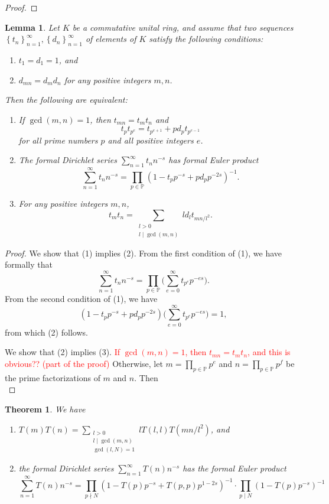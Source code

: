 \documentclass[10pt,leqno,twoside]{article}
\theoremstyle{plain}
\newtheorem{lemma}[lem]{Lemma}
\newtheorem{theorem}[lem]{Theorem}
\theoremstyle{definition}
\numberwithin{equation}{section}
\numberwithin{lem}{section}
\newcommand{\cbr}[1]{\left\{#1\right\}}
\newcommand{\textib}[1]{\textbf{\textit{#1\index{#1}}}} %
\newcommand{\tbd}{{\Huge\color{red}{\textib{TBD}}}}
\newcommand{\sai}[1]{\textcolor{red}{#1}}
\begin{document}
\begin{proof}
    \tbd
\end{proof}
\begin{lemma}\label{lem: miyake lem 4.5.12}
    Let $K$ be a commutative unital ring, and assume that two sequences $\cbr{t_n}_{n=1}^\infty,\cbr{d_n}_{n=1}^\infty$ of elements of $K$ satisfy the following conditions:
    \begin{enumerate}[label=\textup{(\roman*)}]
        \item $t_1 =d_1 = 1$, and 
        \item $d_{mn} = d_md_n$ for any positive integers $m,n$.
    \end{enumerate} Then the following are equivalent:
    \begin{enumerate}[label=\textup{(\arabic*)}]
        \item If $\gcd(m,n) = 1$, then $t_{mn} = t_mt_n$ and \[t_pt_{p^e} = t_{p^{e+1}} + pd_pt_{p^{e-1}}\] for all prime numbers $p$ and all positive integers $e$.
        \item The formal Dirichlet series $\sum_{n=1}^\infty t_nn^{-s}$ has formal Euler product \[\sum_{n=1}^\infty t_nn^{-s} = \prod_{p\in\mathbb P}(1-t_pp^{-s} + pd_pp^{-2s})^{-1}.\]
        \item For any positive integers $m,n$, \[t_mt_n = \sum_{\substack{l>0\\l\mid \gcd(m,n)}}ld_lt_{mn/l^2}.\]
    \end{enumerate}
\end{lemma}
\begin{proof}
    We show that (1) implies (2). From the first condition of (1), we have formally that 
    \[\sum_{n=1}^\infty t_nn^{-s} = \prod_{p\in\mathbb P}\bigg(\sum_{e=0}^\infty t_{p^e}p^{-es}\bigg).\]
    From the second condition of (1), we have \[(1-t_pp^{-s} + pd_pp^{-2s})\bigg(\sum_{e=0}^\infty t_{p^e}p^{-es}\bigg) = 1,\] from which (2) follows. 

    We show that (2) implies (3). \sai{If $\gcd(m,n) =1$, then $t_{mn} = t_mt_n$, and this is obvious?? (part of the proof)} Otherwise, let $m = \prod_{p\in\mathbb P}p^e$ and $n = \prod_{p\in\mathbb P}p^f$ be the prime factorizations of $m$ and $n$. Then \[\]
\end{proof}
\begin{theorem}\label{thm: miyake thm 4.5.13}
    We have \begin{enumerate}[label=\textup{(\arabic*)}]
        \item $T(m)T(n) = \sum_{\substack{l>0 \\ l\mid \gcd(m,n)\\ \gcd(l,N)=1}}lT(l,l)T(mn/l^2)$, and
        \item the formal Dirichlet series $\sum_{n=1}^\infty T(n)n^{-s}$ has the formal Euler product \[\sum_{n=1}^\infty T(n)n^{-s} = \prod_{p\nmid N}(1-T(p)p^{-s} + T(p,p)p^{1-2s})^{-1}\cdot \prod_{p\mid N}(1-T(p)p^{-s})^{-1}\]
    \end{enumerate}
\end{theorem}
\end{document}
